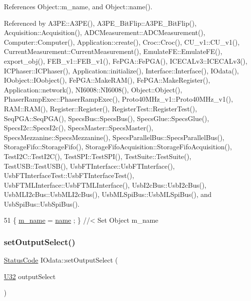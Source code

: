 References Object\+::m\+\_\+name, and Object\+::name().



Referenced by A3\+P\+E\+::\+A3\+P\+E(), A3\+P\+E\+\_\+\+Bit\+Flip\+::\+A3\+P\+E\+\_\+\+Bit\+Flip(), Acquisition\+::\+Acquisition(), A\+D\+C\+Measurement\+::\+A\+D\+C\+Measurement(), Computer\+::\+Computer(), Application\+::create(), Croc\+::\+Croc(), C\+U\+\_\+v1\+::\+C\+U\+\_\+v1(), Current\+Measurement\+::\+Current\+Measurement(), Emulate\+F\+E\+::\+Emulate\+F\+E(), export\+\_\+obj(), F\+E\+B\+\_\+v1\+::\+F\+E\+B\+\_\+v1(), Fe\+P\+G\+A\+::\+Fe\+P\+G\+A(), I\+C\+E\+C\+A\+Lv3\+::\+I\+C\+E\+C\+A\+Lv3(), I\+C\+Phaser\+::\+I\+C\+Phaser(), Application\+::initialize(), Interface\+::\+Interface(), I\+Odata(), I\+Oobject\+::\+I\+Oobject(), Fe\+P\+G\+A\+::\+Make\+R\+A\+M(), Fe\+P\+G\+A\+::\+Make\+Register(), Application\+::network(), N\+I6008\+::\+N\+I6008(), Object\+::\+Object(), Phaser\+Ramp\+Exec\+::\+Phaser\+Ramp\+Exec(), Proto40\+M\+Hz\+\_\+v1\+::\+Proto40\+M\+Hz\+\_\+v1(), R\+A\+M\+::\+R\+A\+M(), Register\+::\+Register(), Register\+Test\+::\+Register\+Test(), Seq\+P\+G\+A\+::\+Seq\+P\+G\+A(), Specs\+Bus\+::\+Specs\+Bus(), Specs\+Glue\+::\+Specs\+Glue(), Specs\+I2c\+::\+Specs\+I2c(), Specs\+Master\+::\+Specs\+Master(), Specs\+Mezzanine\+::\+Specs\+Mezzanine(), Specs\+Parallel\+Bus\+::\+Specs\+Parallel\+Bus(), Storage\+Fifo\+::\+Storage\+Fifo(), Storage\+Fifo\+Acquisition\+::\+Storage\+Fifo\+Acquisition(), Test\+I2\+C\+::\+Test\+I2\+C(), Test\+S\+P\+I\+::\+Test\+S\+P\+I(), Test\+Suite\+::\+Test\+Suite(), Test\+U\+S\+B\+::\+Test\+U\+S\+B(), Usb\+F\+T\+Interface\+::\+Usb\+F\+T\+Interface(), Usb\+F\+T\+Interface\+Test\+::\+Usb\+F\+T\+Interface\+Test(), Usb\+F\+T\+M\+L\+Interface\+::\+Usb\+F\+T\+M\+L\+Interface(), Usb\+I2c\+Bus\+::\+Usb\+I2c\+Bus(), Usb\+M\+L\+I2c\+Bus\+::\+Usb\+M\+L\+I2c\+Bus(), Usb\+M\+L\+Spi\+Bus\+::\+Usb\+M\+L\+Spi\+Bus(), and Usb\+Spi\+Bus\+::\+Usb\+Spi\+Bus().


\begin{DoxyCode}
51 \{ \hyperlink{classObject_a8b83c95c705d2c3ba0d081fe1710f48d}{m\_name}  = \hyperlink{classObject_a300f4c05dd468c7bb8b3c968868443c1}{name}  ; \} \textcolor{comment}{//< Set Object m\_name}
\end{DoxyCode}
\mbox{\label{classIOdata_a09675d3efa14ba00cc22f8ff8d463389}} 
\subsubsection{\texorpdfstring{set\+Output\+Select()}{setOutputSelect()}}
{\footnotesize\ttfamily \hyperlink{classStatusCode}{Status\+Code} I\+Odata\+::set\+Output\+Select (\begin{DoxyParamCaption}\item[{\hyperlink{classIOdata_a96fb57f5fcd87b708743abd3c86a5198}{U32}}]{output\+Select }\end{DoxyParamCaption})\hspace{0.3cm}{\ttfamily [inline]}}

